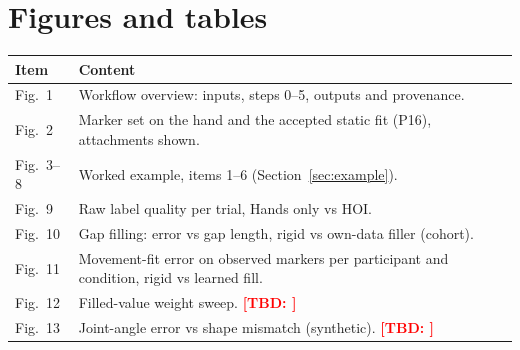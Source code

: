 \documentclass[11pt,a4paper]{article}
\newcommand{\tbd}[1]{\textcolor{red}{\textbf{[TBD: #1]}}}
\begin{document}
\section*{Figures and tables}
\begin{tabularx}{\linewidth}{@{}lX@{}}\toprule
Item & Content \\\midrule
Fig.~1 & Workflow overview: inputs, steps 0--5, outputs and provenance. \\
Fig.~2 & Marker set on the hand and the accepted static fit (P16), attachments shown. \\
Fig.~3--8 & Worked example, items 1--6 (Section~\ref{sec:example}). \\
Fig.~9 & Raw label quality per trial, Hands only vs HOI. \\
Fig.~10 & Gap filling: error vs gap length, rigid vs own-data filler (cohort). \\
Fig.~11 & Movement-fit error on observed markers per participant and condition, rigid vs learned fill. \\
Fig.~12 & Filled-value weight sweep. \tbd{} \\
Fig.~13 & Joint-angle error vs shape mismatch (synthetic). \tbd{} \\\bottomrule
\end{tabularx}
\end{document}
